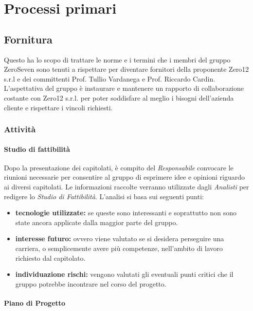 \section{Processi primari}
\subsection{Fornitura}			
Questo  ha lo scopo di trattare le norme e i termini che i membri del gruppo ZeroSeven sono tenuti a rispettare per diventare fornitori della proponente Zero12 s.r.l e dei committenti Prof. Tullio Vardanega e Prof. Riccardo Cardin. \\
L'aspettativa del gruppo è instaurare e mantenere un rapporto di collaborazione costante con Zero12 s.r.l. per poter soddisfare al meglio i bisogni dell'azienda cliente e rispettare i vincoli richiesti.

\subsubsection{Attività}
\paragraph{Studio di fattibilità}
Dopo la presentazione dei capitolati, è compito del \textit{Responsabile} convocare le riunioni necessarie per consentire al gruppo di esprimere idee e opinioni riguardo ai diversi capitolati. Le informazioni raccolte verranno utilizzate dagli \textit{Analisti} per redigere lo \textit{Studio di Fattibilità}. L'analisi si basa sui seguenti punti:
\begin{itemize}
	\item \textbf{tecnologie utilizzate:} se queste sono interessanti e soprattutto non sono state ancora applicate dalla maggior parte del gruppo.
	\item \textbf{interesse futuro:} ovvero viene valutato se si desidera perseguire una carriera, o semplicemente avere più competenze, nell'ambito di lavoro richiesto dal capitolato.
	\item \textbf{individuazione rischi:} vengono valutati gli eventuali punti critici che il gruppo potrebbe incontrare nel corso del progetto.
\end{itemize}

\paragraph{Piano di Progetto}

